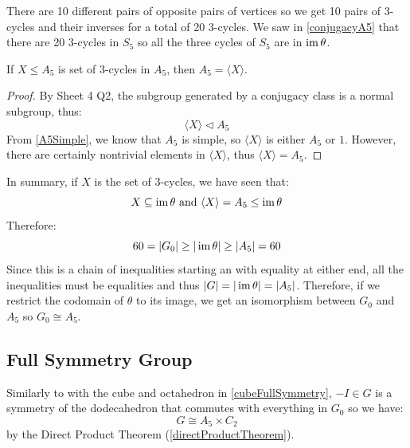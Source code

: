 \documentclass[../main.tex]{subfiles}
\begin{document}
There are 10 different pairs of opposite pairs of vertices so we get 10 pairs of 3-cycles and their inverses for a total of 20 3-cycles.
We saw in \cref{conjugacyA5} that there are 20 3-cycles in $S_5$ so all the three cycles of $S_5$ are in $\operatorname{im} \theta$.
\begin{lemma}
  If $X \leq A_5$ is set of 3-cycles in $A_5$, then $A_5 = \langle X \rangle$.
\end{lemma}
\begin{proof}
  By Sheet 4 Q2, the subgroup generated by a conjugacy class is a normal subgroup, thus:
  \[
    \langle X \rangle \lhd A_5
  \]
  From \cref{A5Simple}, we know that $A_5$ is simple, so $\langle X \rangle$ is either $A_5$ or $1$.
  However, there are certainly nontrivial elements in $\langle X \rangle$, thus $\langle X \rangle = A_5$.
\end{proof}
In summary, if $X$ is the set of 3-cycles, we have seen that:
\[
  X \subseteq \operatorname{im} \theta \text{ and } \langle X \rangle = A_5 \leq \operatorname{im} \theta
\]
Therefore:
\[
  60 = |G_0| \geq |\operatorname{im} \theta| \geq |A_5| = 60
\]
Since this is a chain of inequalities starting an with equality at either end, all the inequalities must be equalities and thus $|G| = |\operatorname{im} \theta| = |A_5|$.
Therefore, if we restrict the codomain of $\theta$ to its image, we get an isomorphism between $G_0$ and $A_5$ so $G_0 \cong A_5$.
\subsection{Full Symmetry Group}
Similarly to with the cube and octahedron in \cref{cubeFullSymmetry}, $-I \in G$ is a symmetry of the dodecahedron that commutes with everything in $G_0$ so we have:
\[
  G \cong A_5 \times C_2
\]
by the Direct Product Theorem (\cref{directProductTheorem}).
\end{document}
